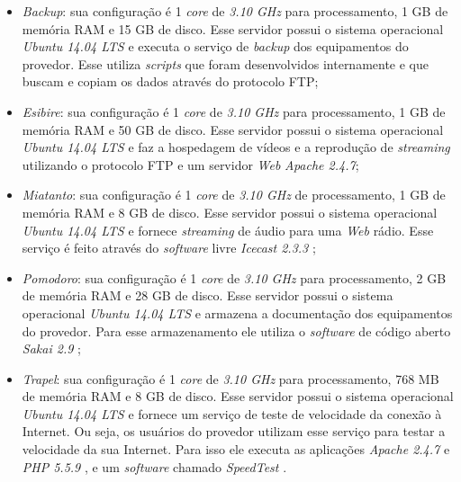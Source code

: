 \begin{itemize}
 \item \textit{Backup}: sua configuração é 1 \textit{core} de \textit{3.10 GHz} para processamento, 1 GB de memória RAM e 15 GB de disco. 
 Esse servidor possui o sistema operacional \textit{Ubuntu 14.04 \ac{LTS}} \cite{ubuntu} e executa o serviço de \textit{backup} dos equipamentos 
 do provedor. Esse utiliza \textit{scripts} que foram desenvolvidos internamente e que buscam e copiam os dados através do protocolo \ac{FTP};
 
 \item \textit{Esibire}: sua configuração é 1 \textit{core} de \textit{3.10 GHz} para processamento, 1 GB de memória RAM e 50 GB de disco. 
 Esse servidor possui o sistema operacional \textit{Ubuntu 14.04 \ac{LTS}} \cite{ubuntu} e faz a hospedagem de vídeos e a reprodução de 
 \textit{streaming} utilizando o protocolo \ac{FTP} e um servidor \textit{Web} \textit{Apache 2.4.7};
 
 \item \textit{Miatanto}: sua configuração é 1 \textit{core} de \textit{3.10 GHz} de processamento, 1 GB de memória RAM e 8 GB de disco. 
 Esse servidor possui o sistema operacional \textit{Ubuntu 14.04 \ac{LTS}} \cite{ubuntu} e fornece \textit{streaming} de áudio para uma \textit{Web} 
 rádio. Esse serviço é feito através do \textit{software} livre \textit{Icecast 2.3.3} \cite{icecast};
 
 \item \textit{Pomodoro}: sua configuração é 1 \textit{core} de \textit{3.10 GHz} para processamento, 2 GB de memória RAM e 28 GB de disco. 
 Esse servidor possui o sistema operacional \textit{Ubuntu 14.04 \ac{LTS}} \cite{ubuntu} e armazena a documentação dos equipamentos do provedor. 
 Para esse armazenamento ele utiliza o \textit{software} de código aberto \textit{Sakai 2.9} \cite{sakai};
 
 \item \textit{Trapel}: sua configuração é 1 \textit{core} de \textit{3.10 GHz} para processamento, 768 MB de memória RAM e 8 GB de disco. 
 Esse servidor possui o sistema operacional \textit{Ubuntu 14.04 \ac{LTS}} \cite{ubuntu} e fornece um serviço de teste de velocidade da conexão 
 à Internet. Ou seja, os usuários do provedor utilizam esse serviço para testar a velocidade da sua Internet. Para isso ele executa as aplicações 
 \textit{Apache 2.4.7} \cite{apache} e \textit{\ac{PHP} 5.5.9} \cite{php}, e um \textit{software} chamado \textit{SpeedTest} \cite{speedtest}.
\end{itemize}

